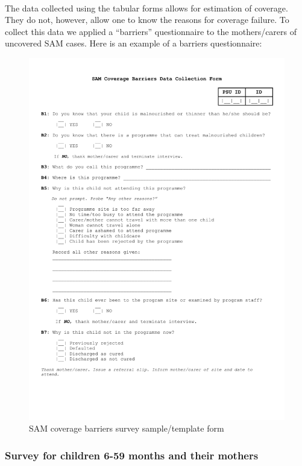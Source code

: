 \documentclass[12pt,a4paper]{article}
\theoremstyle{definition}
\theoremstyle{definition}
\theoremstyle{definition}
\theoremstyle{remark}
\begin{document}
~

The data collected using the tabular forms allows for estimation of
coverage. They do not, however, allow one to know the reasons for
coverage failure. To collect this data we applied a ``barriers''
questionnaire to the mothers/carers of uncovered SAM cases. Here is an
example of a barriers questionnaire:

\newpage

\begin{figure}[H]

{\centering \includegraphics[width=0.9\linewidth]{forms/samBarriersForm} 

}

\caption{SAM coverage barriers survey sample/template form}\label{fig:sambarriers}
\end{figure}

\newpage

\hypertarget{survey-for-children-6-59-months-and-their-mothers}{%
\subsubsection{Survey for children 6-59 months and their
mothers}\label{survey-for-children-6-59-months-and-their-mothers}}
\end{document}
